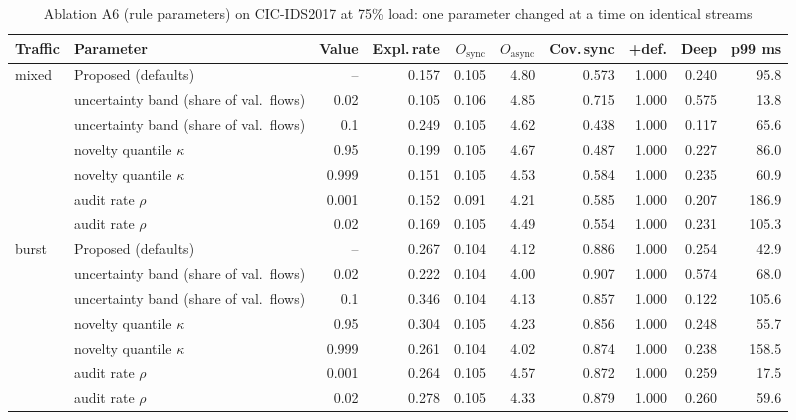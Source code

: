 \begin{table}[!htbp]
\centering
\caption{Ablation A6 (rule parameters) on CIC-IDS2017 at 75\% load: one parameter changed at a time on identical streams}
\label{tab:sens:cic2017_XGB_T3}
\scriptsize
\setlength{\tabcolsep}{3.5pt}
\begin{tabular}{llrrrrrrrr}
\toprule
\textbf{Traffic} & \textbf{Parameter} & \textbf{Value} & \textbf{Expl.\,rate} & \textbf{$O_{\mathrm{sync}}$} & \textbf{$O_{\mathrm{async}}$} & \textbf{Cov.\,sync} & \textbf{+def.} & \textbf{Deep} & \textbf{p99 ms} \\
\midrule
mixed & Proposed (defaults) & -- & 0.157 & 0.105 & 4.80 & 0.573 & 1.000 & 0.240 & 95.8 \\
 & uncertainty band (share of val.\ flows) & 0.02 & 0.105 & 0.106 & 4.85 & 0.715 & 1.000 & 0.575 & 13.8 \\
 & uncertainty band (share of val.\ flows) & 0.1 & 0.249 & 0.105 & 4.62 & 0.438 & 1.000 & 0.117 & 65.6 \\
 & novelty quantile $\kappa$ & 0.95 & 0.199 & 0.105 & 4.67 & 0.487 & 1.000 & 0.227 & 86.0 \\
 & novelty quantile $\kappa$ & 0.999 & 0.151 & 0.105 & 4.53 & 0.584 & 1.000 & 0.235 & 60.9 \\
 & audit rate $\rho$ & 0.001 & 0.152 & 0.091 & 4.21 & 0.585 & 1.000 & 0.207 & 186.9 \\
 & audit rate $\rho$ & 0.02 & 0.169 & 0.105 & 4.49 & 0.554 & 1.000 & 0.231 & 105.3 \\
\midrule
burst & Proposed (defaults) & -- & 0.267 & 0.104 & 4.12 & 0.886 & 1.000 & 0.254 & 42.9 \\
 & uncertainty band (share of val.\ flows) & 0.02 & 0.222 & 0.104 & 4.00 & 0.907 & 1.000 & 0.574 & 68.0 \\
 & uncertainty band (share of val.\ flows) & 0.1 & 0.346 & 0.104 & 4.13 & 0.857 & 1.000 & 0.122 & 105.6 \\
 & novelty quantile $\kappa$ & 0.95 & 0.304 & 0.105 & 4.23 & 0.856 & 1.000 & 0.248 & 55.7 \\
 & novelty quantile $\kappa$ & 0.999 & 0.261 & 0.104 & 4.02 & 0.874 & 1.000 & 0.238 & 158.5 \\
 & audit rate $\rho$ & 0.001 & 0.264 & 0.105 & 4.57 & 0.872 & 1.000 & 0.259 & 17.5 \\
 & audit rate $\rho$ & 0.02 & 0.278 & 0.105 & 4.33 & 0.879 & 1.000 & 0.260 & 59.6 \\
\bottomrule
\end{tabular}
\end{table}
